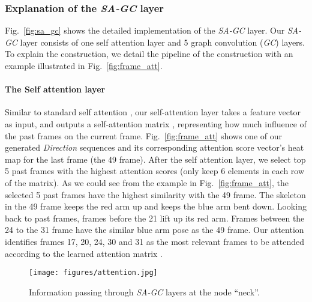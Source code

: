 \documentclass[runningheads]{llncs}
\begin{document}
\subsubsection{Explanation of the {\it SA-GC} layer} \label{sec:sa_gcn_layer}


Fig.~\ref{fig:sa_gc} shows the detailed implementation of the {\it SA-GC} layer. Our {\it SA-GC} layer consists of one self attention layer and 5 graph convolution ({\it GC}) layers. To explain the construction, we detail the pipeline of the construction with an example illustrated in Fig.~\ref{fig:frame_att}.  


\paragraph{The Self attention layer}
Similar to standard self attention \cite{vaswani2017attention}, our self-attention layer takes a feature vector  as input, and outputs a self-attention matrix , representing how much influence of the past frames on the current frame. Fig.~\ref{fig:frame_att} shows one of our generated {\it Direction} sequences and its corresponding attention score vector's heat map for the last frame (the 49 frame). After the self attention layer, we select top 5 past frames with the highest attention scores (only keep 6 elements in each row of the  matrix). As we could see from the example in Fig.~\ref{fig:frame_att}, the selected 5 past frames have the highest similarity with the 49 frame. The skeleton in the 49 frame keeps the red arm up and keeps the blue arm bent down. Looking back to past frames, frames before the 21 lift up its red arm. Frames between the 24 to the 31 frame have the similar blue arm pose as the 49 frame. Our attention identifies frames 17, 20, 24, 30 and 31 as the most relevant frames to be attended according to the learned attention matrix .
\begin{figure}[!t]
    \centering
    \texttt{[image: figures/attention.jpg]}
    \caption{\small{Information passing through {\it SA-GC} layers at the node ``neck''.}}
    \label{fig:gc_att}
\end{figure}
\end{document}
